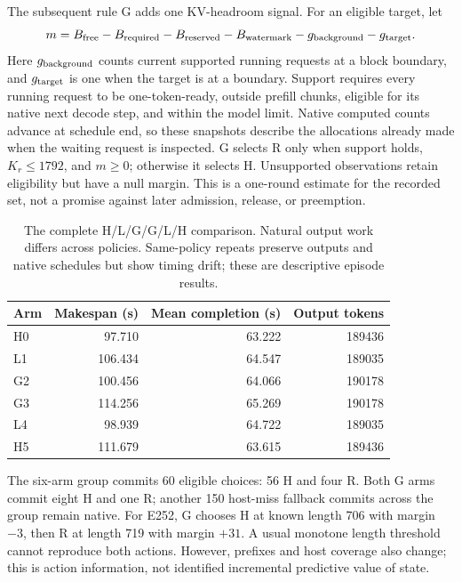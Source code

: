 \documentclass[10pt,a4paper]{article}
\begin{document}
The subsequent rule G adds one KV-headroom signal. For an eligible target, let
\begin{equation}
 m=B_{\rm free}-B_{\rm required}-B_{\rm reserved}-B_{\rm watermark}
       -g_{\rm background}-g_{\rm target}.
 \label{eq:margin}
\end{equation}
Here $g_{\rm background}$ counts current supported running requests at a block
boundary, and $g_{\rm target}$ is one when the target is at a boundary.
Support requires every running request to be one-token-ready, outside prefill
chunks, eligible for its native next decode step, and within the model limit.
Native computed counts advance at schedule end, so these snapshots describe
the allocations already made when the waiting request is inspected. G selects
R only when support holds, $K_r\leq1792$, and $m\geq0$; otherwise it selects H.
Unsupported observations retain eligibility but have a null margin. This is a
one-round estimate for the recorded set, not a promise against later admission,
release, or preemption.

\begin{table}[t]
\centering\small
\caption{The complete H/L/G/G/L/H comparison. Natural output work differs
across policies. Same-policy repeats preserve outputs and native schedules but
show timing drift; these are descriptive episode results.}
\label{tab:headroom}
\begin{tabular}{@{}lrrr@{}}
\toprule
Arm & Makespan (s) & Mean completion (s) & Output tokens \\
\midrule
H0 & 97.710 & 63.222 & 189436 \\
L1 & 106.434 & 64.547 & 189035 \\
G2 & 100.456 & 64.066 & 190178 \\
G3 & 114.256 & 65.269 & 190178 \\
L4 & 98.939 & 64.722 & 189035 \\
H5 & 111.679 & 63.615 & 189436 \\
\bottomrule
\end{tabular}
\end{table}

The six-arm group commits 60 eligible choices: 56 H and four R. Both G arms
commit eight H and one R; another 150 host-miss fallback commits across the
group remain native. For E252, G chooses H at known length 706 with margin
$-3$, then R at length 719 with margin $+31$. A usual monotone length threshold
cannot reproduce both actions. However, prefixes and host coverage also change;
this is action information, not identified incremental predictive value of state.
\end{document}
